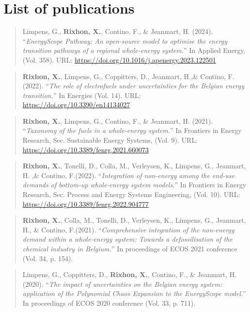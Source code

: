 

\chapter*{List of publications}
\vskip0.5cm


\begin{quote}
Limpens, G., \textbf{Rixhon, X.}, Contino, F., \& Jeanmart, H. (2024). ``\emph{EnergyScope Pathway: An open-source model to optimise the energy transition pathways of a regional whole-energy system.}'' In Applied Energy, (Vol. 358). URL: \url{https://doi.org/10.1016/j.apenergy.2023.122501}
\end{quote}

\begin{quote}
\textbf{Rixhon, X.}, Limpens, G., Coppitters, D., Jeanmart, H.,\& Contino, F.(2022). ``\emph{The role of electrofuels under uncertainties for the Belgian energy transition.}'' In Energies (Vol. 14). URL: \url{https://doi.org/10.3390/en14134027}
\end{quote}

\begin{quote}
\textbf{Rixhon, X.}, Limpens, G., Contino, F., \& Jeanmart, H. (2021). ``\emph{Taxonomy of the fuels in a whole-energy system.}'' In Frontiers in Energy Research, Sec. Sustainable Energy Systems, (Vol. 9). URL: \url{https://doi.org/10.3389/fenrg.2021.660073} 
\end{quote}

\begin{quote}
\textbf{Rixhon, X.}, Tonelli, D., Colla, M., Verleysen, K., Limpens, G., Jeanmart, H. ,\& Contino, F.(2022). ``\emph{Integration of non-energy among the end-use demands of bottom-up whole-energy system models.}'' In Frontiers in Energy Research, Sec. Process and Energy Systems Engineering, (Vol. 10). URL: \url{https://doi.org/10.3389/fenrg.2022.904777}
\end{quote}

\begin{quote}
\textbf{Rixhon, X.}, Colla, M., Tonelli, D., Verleysen, K.,  Limpens, G., Jeanmart, H., \& Contino, F.(2021). ``\emph{Comprehensive integration of the non-energy demand within a whole-energy system: Towards a defossilisation of the chemical industry in Belgium.}'' In proceedings of  ECOS 2021 conference (Vol. 34, p. 154).
\end{quote}

\begin{quote}
Limpens, G., Coppitters, D., \textbf{Rixhon, X.}, Contino, F., \& Jeanmart, H. (2020). ``\emph{The impact of uncertainties on the Belgian energy system: application of the Polynomial Chaos Expansion to the EnergyScope model.}'' In proceedings of  ECOS 2020 conference (Vol. 33, p. 711).
\end{quote}